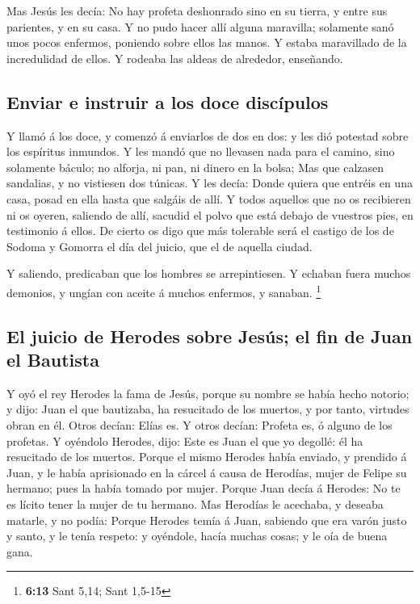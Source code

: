  Mas Jesús les decía: No hay profeta deshonrado sino en su
tierra, y entre sus parientes, y en su casa.  Y no pudo
hacer allí alguna maravilla; solamente sanó unos pocos enfermos,
poniendo sobre ellos las manos.  Y estaba maravillado de
la incredulidad de ellos. Y rodeaba las aldeas de alrededor, enseñando.

\hypertarget{enviar-e-instruir-a-los-doce-discuxedpulos}{%
\subsection{Enviar e instruir a los doce
discípulos}\label{enviar-e-instruir-a-los-doce-discuxedpulos}}

 Y llamó á los doce, y comenzó á enviarlos de dos en dos:
y les dió potestad sobre los espíritus inmundos.  Y les
mandó que no llevasen nada para el camino, sino solamente báculo; no
alforja, ni pan, ni dinero en la bolsa;  Mas que calzasen
sandalias, y no vistiesen dos túnicas.  Y les decía:
Donde quiera que entréis en una casa, posad en ella hasta que salgáis de
allí.  Y todos aquellos que no os recibieren ni os
oyeren, saliendo de allí, sacudid el polvo que está debajo de vuestros
pies, en testimonio á ellos. De cierto os digo que más tolerable será el
castigo de los de Sodoma y Gomorra el día del juicio, que el de aquella
ciudad.

 Y saliendo, predicaban que los hombres se arrepintiesen.
 Y echaban fuera muchos demonios, y ungían con aceite á
muchos enfermos, y sanaban. \footnote{\textbf{6:13} Sant 5,14; Sant
  1,5-15}

\hypertarget{el-juicio-de-herodes-sobre-jesuxfas-el-fin-de-juan-el-bautista}{%
\subsection{El juicio de Herodes sobre Jesús; el fin de Juan el
Bautista}\label{el-juicio-de-herodes-sobre-jesuxfas-el-fin-de-juan-el-bautista}}

 Y oyó el rey Herodes la fama de Jesús, porque su nombre
se había hecho notorio; y dijo: Juan el que bautizaba, ha resucitado de
los muertos, y por tanto, virtudes obran en él.  Otros
decían: Elías es. Y otros decían: Profeta es, ó alguno de los profetas.
 Y oyéndolo Herodes, dijo: Este es Juan el que yo
degollé: él ha resucitado de los muertos.  Porque el
mismo Herodes había enviado, y prendido á Juan, y le había aprisionado
en la cárcel á causa de Herodías, mujer de Felipe su hermano; pues la
había tomado por mujer.  Porque Juan decía á Herodes: No
te es lícito tener la mujer de tu hermano.  Mas Herodías
le acechaba, y deseaba matarle, y no podía:  Porque
Herodes temía á Juan, sabiendo que era varón justo y santo, y le tenía
respeto: y oyéndole, hacía muchas cosas; y le oía de buena gana.

